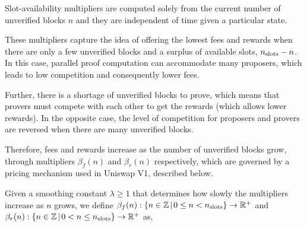 \documentclass[9pt,oneside]{amsart}
\begin{document}
\begin{multicols}{2}
Slot-availability multipliers are computed solely from the current number of unverified blocks $n$ and they are independent of time given a particular state. 

These multipliers capture the idea of offering the lowest fees and rewards when there are only a few unverified blocks and a surplus of available slots, $n_\textnormal{slots}-n$. In this case, parallel proof computation can accommodate many proposers, which leads to low competition and consequently lower fees. 

Further, there is a shortage of unverified blocks to prove, which means that provers must compete with each other to get the rewards (which allows lower rewards). In the opposite case, the level of competition for proposers and provers are reversed when there are many unverified blocks. 


Therefore, fees and rewards increase as the number of unverified blocks grow, through multipliers $\beta_f(n)$ and $\beta_r(n)$ respectively, which are governed by a 
pricing mechanism used in Uniswap V1, described below.

Given a smoothing constant $\lambda \geq 1$ that determines how slowly the multipliers increase as $n$ grows, 
we define $\beta_f(n): \{n\in \mathbb{Z} \hspace{0.02in}|\hspace{0.02in}  0 \leq n < n_\textnormal{slots} \}\rightarrow \mathbb{R}^+$ and $\beta_r(n): \{n\in \mathbb{Z} \hspace{0.02in}|\hspace{0.02in}  0 < n \leq n_\textnormal{slots} \}\rightarrow \mathbb{R}^+$ as, 


\end{multicols}
\end{document}

